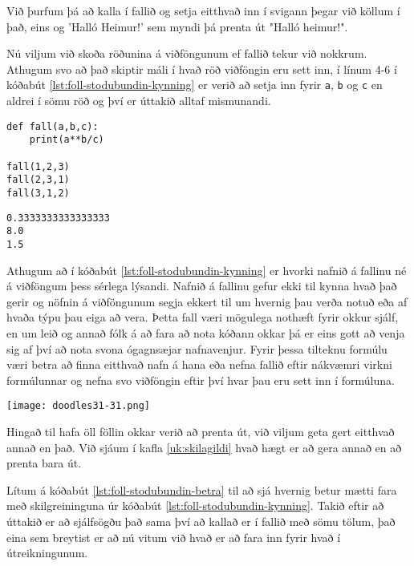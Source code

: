 Við þurfum þá að kalla í fallið og setja eitthvað inn í svigann þegar við köllum í það, eins og 'Halló Heimur!' sem myndi þá prenta út "Halló heimur!".

Nú viljum við skoða röðunina á viðföngunum ef fallið tekur við nokkrum.
Athugum svo að það skiptir máli í hvað röð viðföngin eru sett inn, í línum 4-6 í kóðabút \ref{lst:foll-stodubundin-kynning} er verið að setja inn fyrir \texttt{a}, \texttt{b} og \texttt{c} en aldrei í sömu röð og því er úttakið alltaf mismunandi.

\begin{lstlisting}[caption=Stöðubundin viðföng kynnt, label=lst:foll-stodubundin-kynning]
def fall(a,b,c):
	print(a**b/c)

fall(1,2,3)
fall(2,3,1)
fall(3,1,2)
\end{lstlisting}
\lstset{style=uttak}
\begin{lstlisting}
0.3333333333333333
8.0
1.5
\end{lstlisting}
\lstset{style=venjulegt}

Athugum að í kóðabút \ref{lst:foll-stodubundin-kynning} er hvorki nafnið á fallinu né á viðföngum þess sérlega lýsandi.
Nafnið á fallinu gefur ekki til kynna hvað það gerir og nöfnin á viðföngunum segja ekkert til um hvernig þau verða notuð eða af hvaða týpu þau eiga að vera.
Þetta fall væri mögulega nothæft fyrir okkur sjálf, en um leið og annað fólk á að fara að nota kóðann okkar þá er eins gott að venja sig af því að nota svona ógagnsæjar nafnavenjur.
Fyrir þessa tilteknu formúlu væri betra að finna eitthvað nafn á hana eða nefna fallið eftir nákvæmri virkni formúlunnar og nefna svo viðföngin eftir því hvar þau eru sett inn í formúluna.

	\begin{center}
		\texttt{[image: doodles31-31.png]}
	\end{center}

Hingað til hafa öll föllin okkar verið að prenta út, við viljum geta gert eitthvað annað en það.
Við sjáum í kafla \ref{uk:skilagildi} hvað hægt er að gera annað en að prenta bara út.

Lítum á kóðabút \ref{lst:foll-stodubundin-betra} til að sjá hvernig betur mætti fara með skilgreininguna úr kóðabút \ref{lst:foll-stodubundin-kynning}.
Takið eftir að úttakið er að sjálfsögðu það sama því að kallað er í fallið með sömu tölum, það eina sem breytist er að nú vitum við hvað er að fara inn fyrir hvað í útreikningunum.

